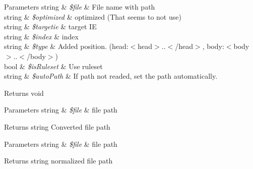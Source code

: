 \begin{DoxyRefList}
\item[\label{deprecated__deprecated000004}%
\hypertarget{deprecated__deprecated000004}{}%
Member \hyperlink{classContext_a69807c3ced3f97920b233a3fce3bb492}{Context\+:\+:add\+Js\+File} (\$file, \$optimized=F\+A\+L\+S\+E, \$targetie= '', \$index=0, \$type= 'head', \$is\+Ruleset=F\+A\+L\+S\+E, \$auto\+Path=null)]
\begin{DoxyParams}[1]{Parameters}
string & {\em \$file} & File name with path \\
\hline
string & {\em \$optimized} & optimized (That seems to not use) \\
\hline
string & {\em \$targetie} & target I\+E \\
\hline
string & {\em \$index} & index \\
\hline
string & {\em \$type} & Added position. (head\+:$<$head$>$..$<$/head$>$, body\+:$<$body$>$..$<$/body$>$) \\
\hline
bool & {\em \$is\+Ruleset} & Use ruleset \\
\hline
string & {\em \$auto\+Path} & If path not readed, set the path automatically. \\
\hline
\end{DoxyParams}
\begin{DoxyReturn}{Returns}
void  
\end{DoxyReturn}

\item[\label{deprecated__deprecated000003}%
\hypertarget{deprecated__deprecated000003}{}%
Member \hyperlink{classContext_a217a7ff0e32178c6a2cc761de9c88998}{Context\+:\+:get\+Abs\+File\+Url} (\$file)]
\begin{DoxyParams}[1]{Parameters}
string & {\em \$file} & file path \\
\hline
\end{DoxyParams}
\begin{DoxyReturn}{Returns}
string Converted file path  
\end{DoxyReturn}

\item[\label{deprecated__deprecated000002}%
\hypertarget{deprecated__deprecated000002}{}%
Member \hyperlink{classContext_a47a8a7878385f0d5cb7085f933157128}{Context\+:\+:normalize\+File\+Path} (\$file)]
\begin{DoxyParams}[1]{Parameters}
string & {\em \$file} & file path \\
\hline
\end{DoxyParams}
\begin{DoxyReturn}{Returns}
string normalized file path  
\end{DoxyReturn}


\end{DoxyRefList}
